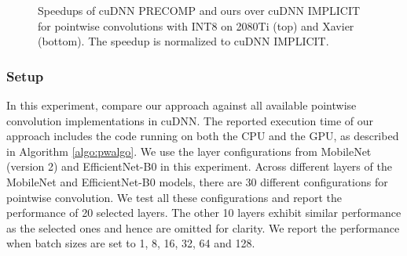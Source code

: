 \begin{figure}
\captionsetup[subfloat]{labelformat=empty,skip=0pt}

	\centering
	\vspace{-5mm}
	\vspace{-6mm}
	\caption{Speedups of cuDNN PRECOMP and ours over cuDNN IMPLICIT for pointwise convolutions with INT8 on 2080Ti (top) and Xavier (bottom). The speedup is normalized to cuDNN IMPLICIT.}
	\label{fig:pwspeedupint8}
\end{figure}


\subsubsection{Setup} In this experiment,  compare our approach against all available pointwise convolution implementations in cuDNN.
The reported execution time of our approach includes the code running on both the CPU and the GPU, as described in Algorithm
\ref{algo:pwalgo}. We use the layer configurations from MobileNet (version 2) and EfficientNet-B0 in this experiment. Across different layers of the MobileNet and EfficientNet-B0
models, there are 30 different configurations for pointwise convolution. We test all these configurations and report the performance of 20
selected layers. The other 10 layers exhibit similar performance as the selected ones and hence are omitted for clarity. We report the
performance when batch sizes are set to 1, 8, 16, 32, 64 and 128.

